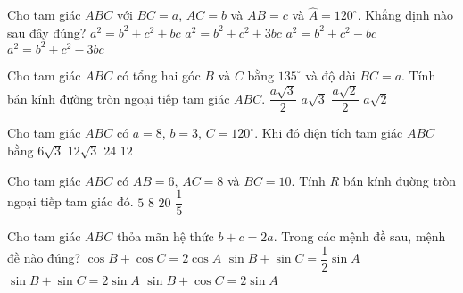 \begin{ex}%
	Cho tam giác $ABC$ với $BC=a$, $AC=b$ và $AB=c$ và $\widehat{A}=120^\circ$. Khẳng định nào sau đây đúng?
	\choice
	{\True $a^2=b^2+c^2+bc$}
	{$a^2=b^2+c^2+3bc$}
	{$a^2=b^2+c^2-bc$}
	{$a^2=b^2+c^2-3bc$}
\end{ex}
\begin{ex}%
	Cho tam giác $ABC$ có tổng hai góc $B$ và $C$ bằng $135^\circ$ và độ dài $BC=a$. Tính bán kính đường tròn ngoại tiếp tam giác $ABC$.
	\choice
	{$\dfrac{a\sqrt{3}}{2}$}
	{$a\sqrt{3}$}
	{\True $\dfrac{a\sqrt{2}}{2}$}
	{$a\sqrt{2}$}
\end{ex}
\begin{ex}%
	Cho tam giác $ABC$ có $a=8$, $b=3$, $C=120^\circ$. Khi đó diện tích tam giác $ABC$ bằng
	\choice
	{\True $6\sqrt{3}$}
	{$12\sqrt{3}$}
	{$24$}
	{$12$}
\end{ex}
\begin{ex}%
	Cho tam giác $ABC$ có $AB=6$, $AC=8$ và $BC=10$. Tính $R$ bán kính đường tròn ngoại tiếp tam giác đó.
	\choice
	{\True $5$}
	{$8$}
	{$20$}
	{$\dfrac{1}{5}$}
\end{ex}
\begin{ex}%
	Cho tam giác $ABC$ thỏa mãn hệ thức $b+c=2a$. Trong các mệnh đề sau, mệnh đề nào đúng?
	\choice
	{$\cos B+\cos C=2\cos A$}
	{$\sin B+\sin C=\dfrac{1}{2}\sin A$}
	{\True $\sin B+\sin C=2\sin A$}
	{$\sin B+\cos C=2\sin A$}
\end{ex}
